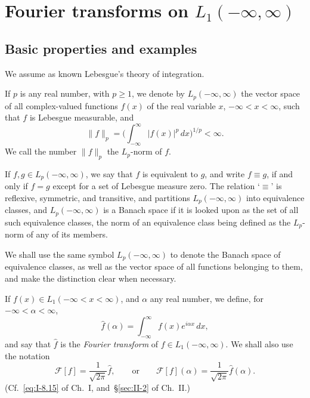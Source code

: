\chapter{Fourier transforms on \texorpdfstring{$L_1(-\infty,\infty)$}{L1(-infinity, infinity)}}
\label{ch:I}

\section{Basic properties and examples}
\label{sec:I-1}

We assume as known Lebesgue's theory of integration.

If $p$ is any real number, with $p\ge 1$, we denote by $L_p(-\infty,\infty)$ the vector space of all complex-valued functions $f(x)$ of the real variable $x$, $-\infty<x<\infty$, such that $f$ is Lebesgue measurable, and
\begin{equation}\label{eq:I-1.0}
\|f\|_p=\biggl(\int_{-\infty}^{\infty}|f(x)|^p\,dx\biggr)^{1/p}<\infty.
\end{equation}
We call the number $\|f\|_p$ the $L_p$-norm of $f$.

If $f,g\in L_p(-\infty,\infty)$, we say that $f$ is equivalent to $g$, and write $f\equiv g$, if and only if $f=g$ except for a set of Lebesgue measure zero. The relation `$\equiv$' is reflexive, symmetric, and transitive, and partitions $L_p(-\infty,\infty)$ into equivalence classes, and $L_p(-\infty,\infty)$ is a Banach space if it is looked upon as the set of all such equivalence classes, the norm of an equivalence class being defined as the $L_p$-norm of any of its members.

We shall use the same symbol $L_p(-\infty,\infty)$ to denote the Banach space of equivalence classes, as well as the vector space of all functions belonging to them, and make the distinction clear when necessary.

If $f(x)\in L_1(-\infty<x<\infty)$, and $\alpha$ any real number, we define, for $-\infty<\alpha<\infty$,
\begin{equation}\label{eq:I-1.1}
\widehat f(\alpha)=\int_{-\infty}^{\infty}f(x)e^{i\alpha x}\,dx,
\end{equation}
and say that $\hat f$ is the \emph{Fourier transform} of $f\in L_1(-\infty,\infty)$. We shall also use the notation
\begin{equation}\label{eq:I-1.2}
\mathcal F[f]=\frac{1}{\sqrt{2\pi}}\hat f,\qquad\text{or}\qquad
\mathcal F[f](\alpha)=\frac{1}{\sqrt{2\pi}}\hat f(\alpha).
\end{equation}
(Cf.\ \eqref{eq:I-8.15} of Ch.~I, and~\S\ref{sec:II-2} of Ch.~II.)

